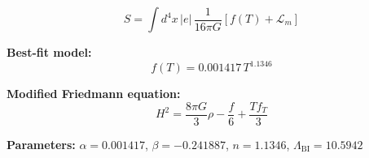 
\begin{equation}
  S = \int d^4x \, |e| \, \frac{1}{16\pi G} \left[ f(T) + \mathcal{L}_m \right]
\end{equation}

\textbf{Best-fit model:}
\begin{equation}
  f(T) = 0.001417 \, T^{1.1346}
\end{equation}

\textbf{Modified Friedmann equation:}
\begin{equation}
  H^2 = \frac{8\pi G}{3} \rho - \frac{f}{6} + \frac{T f_T}{3}
\end{equation}

\textbf{Parameters:}
$\alpha = 0.001417$, \quad
$\beta = -0.241887$, \quad
$n = 1.1346$, \quad
$\Lambda_{\text{BI}} = 10.5942$